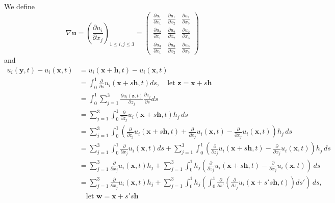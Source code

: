 We define
\begin{equation}
\nabla \textbf{u} = \left(\frac{\partial u_i}{\partial x_j}\right)_{1\leq i,j\leq 3}
= \begin{pmatrix}
\frac{\partial u_1}{\partial x_1} & \frac{\partial u_1}{\partial x_2} & \frac{\partial u_1}{\partial x_3}\\
\frac{\partial u_2}{\partial x_1} & \frac{\partial u_2}{\partial x_2} & \frac{\partial u_2}{\partial x_3}\\
\frac{\partial u_3}{\partial x_1} & \frac{\partial u_3}{\partial x_2} & \frac{\partial u_3}{\partial x_3}
\end{pmatrix}
\end{equation}
and 
\begin{equation}
\begin{aligned}
u_i(\textbf{y},t) - u_i(\textbf{x},t)
&= u_i(\textbf{x}+\textbf{h},t) - u_i(\textbf{x},t)\\
&= \int_{0}^{1}\frac{\partial}{\partial s} u_i(\textbf{x}+s\textbf{h},t)ds,
\quad\text{let $\textbf{z}=\textbf{x}+s\textbf{h}$}\\
&=  \int_{0}^{1} \sum_{j=1}^{3} \frac{\partial u_i(\textbf{z},t)}{\partial z_j}\frac{\partial z_j}{\partial s}ds\\
&= \sum_{j=1}^{3} \int_{0}^{1} \frac{\partial}{\partial z_j}u_i(\textbf{x}+s\textbf{h},t)h_j\,ds\\
&= \sum_{j=1}^{3}\int_{0}^{1} \left(\frac{\partial}{\partial z_j}u_i(\textbf{x}+s\textbf{h},t) + \frac{\partial}{\partial x_j}u_i(\textbf{x},t) - \frac{\partial}{\partial x_j}u_i(\textbf{x},t)\right)h_j\,ds\\
&= \sum_{j=1}^{3}\int_{0}^{1}\frac{\partial}{\partial x_j}u_i(\textbf{x},t)ds + \sum_{j=1}^{3}\int_{0}^{1} \left(\frac{\partial}{\partial z_j}u_i(\textbf{x}+s\textbf{h},t)  - \frac{\partial}{\partial x_j}u_i(\textbf{x},t)\right)h_j\,ds\\
&= \sum_{j=1}^{3}\frac{\partial}{\partial x_j}u_i(\textbf{x},t) h_j
+ \sum_{j=1}^{3}\int_{0}^{1} h_j \left(\frac{\partial}{\partial z_j}u_i(\textbf{x}+s\textbf{h},t)  - \frac{\partial}{\partial x_j}u_i(\textbf{x},t)\right)\,ds\\
&= \sum_{j=1}^{3}\frac{\partial}{\partial x_j}u_i(\textbf{x},t) h_j
+ \sum_{j=1}^{3}\int_{0}^{1} h_j \left(\int_{0}^{1}\frac{\partial}{\partial s'}
\left(\frac{\partial}{\partial z_j}u_i(\textbf{x}+s's\textbf{h},t)\right) ds'\right)\,ds,\\[6pt]
&\quad\text{let $\textbf{w}=\textbf{x}+s's\textbf{h}$}\\

\end{aligned}
\end{equation}
